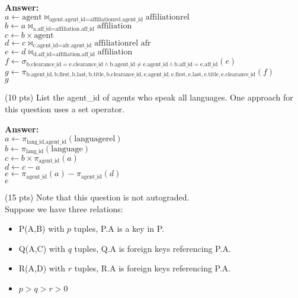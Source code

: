 \begin{questions}
\textbf{Answer:} \\
$a \leftarrow \text{agent} \bowtie_{\text{agent.agent\_id} = \text{affiliationrel.agent\_id}} \text{affiliationrel}$ \\
$b \leftarrow a \bowtie_{\text{a.aff\_id} = \text{affiliation.aff\_id}} \text{affiliation}$ \\
$c \leftarrow b \times \text{agent}$ \\
$d \leftarrow c \bowtie_{\text{c.agent\_id} = \text{afr.agent\_id}} \text{affiliationrel afr} $\\
$e \leftarrow d \bowtie_{\text{d.aff\_id} = \text{affiliation.aff\_id}} \text{affiliation}$ \\
$f \leftarrow \sigma_{\text{b.clearance\_id} = \text{e.clearance\_id} \land \text{b.agent\_id} \neq \text{e.agent\_id} \land \text{b.aff\_id} = \text{e.aff\_id}}(e) $\\
$g \leftarrow \pi_{\text{b.agent\_id}, \text{b.first}, \text{b.last}, \text{b.title}, \text{b.clearance\_id}, \text{e.agent\_id}, \text{e.first}, \text{e.last}, \text{e.title}, \text{e.clearance\_id}}(f)$ \\
$g$
\vspace{15 mm}

\question (10 pts) List the agent\_id of agents who speak all languages. One approach for this question uses a set operator.

\textbf{Answer:} \\
$a \leftarrow \pi_{\text{lang\_id}, \text{agent\_id}} (\text{languagerel})$\\
$b \leftarrow \pi_{\text{lang\_id}} (\text{language})$\\
$c \leftarrow b \times \pi_{\text{agent\_id}}(a)$\\
$d \leftarrow c - a$\\
$e \leftarrow \pi_{\text{agent\_id}}(a) - \pi_{\text{agent\_id}}(d)$\\
$e$
\vspace{15 mm}

\question (15 pts) 
Note that this question is not autograded. \\
Suppose we have three relations:
\begin{itemize}
    \item P(A,B) with $p$ tuples, P.A is a key in P.
    \item Q(A,C) with $q$ tuples, Q.A is foreign keys referencing P.A.
    \item R(A,D) with $r$ tuples, R.A is foreign keys referencing P.A.
    \item $p>q>r>0$
\end{itemize}


\end{questions}
